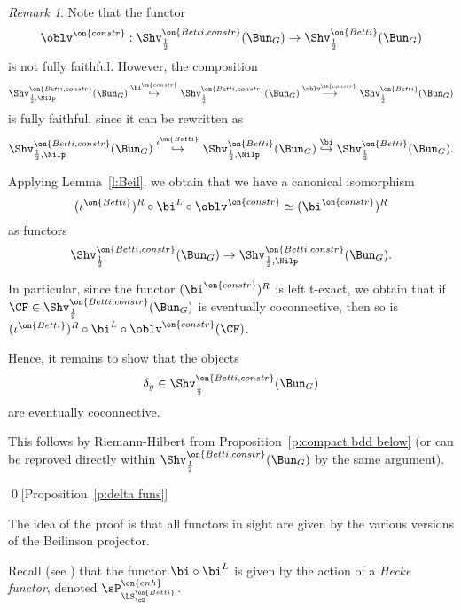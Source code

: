 \documentclass[9pt]{amsart}
\theoremstyle{remark}
\newtheorem{rem}[subsubsection]{Remark}
\theoremstyle{definition}
\theoremstyle{remark}
\newcommand{\lemref}[1]{Lemma~\ref{#1}}
\newcommand{\propref}[1]{Proposition~\ref{#1}}
\numberwithin{equation}{section}
\begin{document}
\begin{rem}
Note that the functor 
\begin{equation} \label{e:forget constr}
\oblv^{\on{constr}}:\Shv^{\on{Betti,constr}}_{\frac{1}{2}}(\Bun_G) \to \Shv^{\on{Betti}}_{\frac{1}{2}}(\Bun_G)
\end{equation} 
is not fully faithful. However, the composition
$$\Shv^{\on{Betti,constr}}_{\frac{1}{2},\Nilp}(\Bun_G) \overset{\bi^{\on{constr}}}\hookrightarrow 
\Shv^{\on{Betti,constr}}_{\frac{1}{2}}(\Bun_G) \overset{\oblv^{\on{constr}}}\longrightarrow  \Shv^{\on{Betti}}_{\frac{1}{2}}(\Bun_G)$$
is fully faithful, since it can be rewritten as
$$\Shv^{\on{Betti,constr}}_{\frac{1}{2},\Nilp}(\Bun_G) \overset{\iota^{\on{Betti}}}\hookrightarrow 
\Shv^{\on{Betti}}_{\frac{1}{2},\Nilp}(\Bun_G)\overset{\bi}\hookrightarrow \Shv^{\on{Betti}}_{\frac{1}{2}}(\Bun_G).$$
\end{rem}

\sssec{}

Applying \lemref{l:Beil}, we obtain that we have a canonical
isomorphism 
$$(\iota^{\on{Betti}})^R\circ \bi^L\circ \oblv^{\on{constr}}\simeq (\bi^{\on{constr}})^R$$
as functors
$$\Shv^{\on{Betti,constr}}_{\frac{1}{2}}(\Bun_G)\to \Shv^{\on{Betti,constr}}_{\frac{1}{2},\Nilp}(\Bun_G).$$

\medskip

In particular, since the functor $(\bi^{\on{constr}})^R$ is left t-exact, we obtain that if $\CF\in \Shv^{\on{Betti,constr}}_{\frac{1}{2}}(\Bun_G)$ 
is eventually coconnective, then so is $(\iota^{\on{Betti}})^R\circ \bi^L\circ \oblv^{\on{constr}}(\CF)$.

\sssec{}

Hence, it remains to show that the objects
$$\delta_y\in \Shv^{\on{Betti,constr}}_{\frac{1}{2}}(\Bun_G)$$
are eventually coconnective.

\medskip

This follows by Riemann-Hilbert from \propref{p:compact bdd below} (or can be reproved directly within 
$\Shv^{\on{Betti,constr}}_{\frac{1}{2}}(\Bun_G)$ by the same argument).

\qed[\propref{p:delta funs}]

\ssec{Proof of \lemref{l:Beil}}

The idea of the proof is that all functors in sight are given by the various versions of the Beilinson projector. 

\sssec{}

Recall (see \cite[Corollary 18.2.9(a)]{AGKRRV}) that the functor $\bi\circ \bi^L$ is given by 
the action of a \emph{Hecke functor}, denoted $\sP^{\on{enh}}_{\LS_\cG^{\on{Betti}}}$.
\end{document}

